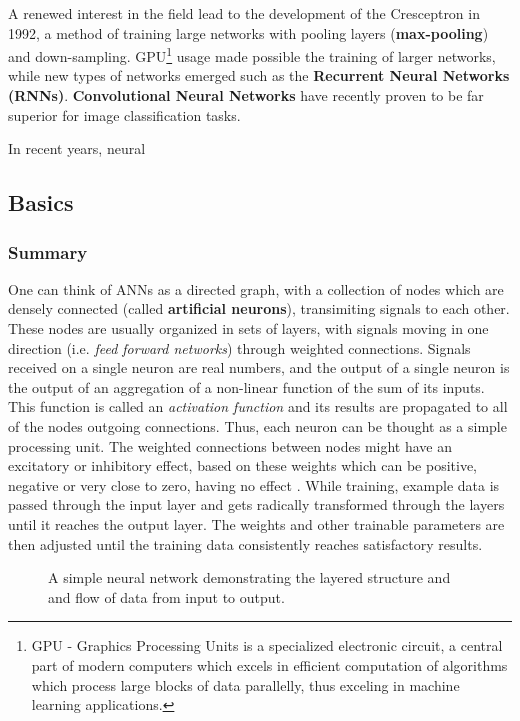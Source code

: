 A renewed interest in the field lead to the development of the
Cresceptron \cite{article:Cresceptron} in 1992, a method of training
large networks with pooling layers (\textbf{max-pooling}) and down-sampling.
GPU\footnote{GPU - Graphics Processing Units is a specialized
electronic circuit, a central part of modern computers which excels in
    efficient computation of algorithms which process large blocks of data
    parallelly, thus exceling in machine learning applications.} usage made
    possible the training of larger networks, while new types of networks
    emerged such as the \textbf{Recurrent Neural Networks (RNNs)}.
    \textbf{Convolutional Neural Networks} have recently proven to be
    far superior for image classification tasks.

    In recent years, neural 


    \subsection{Basics}
    \subsubsection{Summary}

    One can think of ANNs as a directed graph, with a collection of nodes
    which are densely connected (called \textbf{artificial neurons}),
    transimiting signals to each other. These nodes are usually organized
    in sets of layers, with signals moving in one direction
    (i.e. \textit{feed forward networks}) through weighted connections.
    Signals received on a single neuron are real numbers, and the output
    of a single neuron is the output of an aggregation of a non-linear
    function of the sum of its inputs. This function is called an
    \textit{activation function} and its results are propagated to all of
    the nodes outgoing connections.  Thus, each neuron can be thought as a
    simple processing unit. The weighted connections between nodes might
    have an excitatory or inhibitory effect, based on these weights which
    can be positive, negative or very close to zero, having no effect
    \cite[Chap. ~ 1]{book:Gurney1997AnIT}. While training, example
    data is passed through the input layer and gets radically transformed
    through the layers until it reaches the output layer. The weights and
    other trainable parameters are then adjusted until the training data
    consistently reaches satisfactory results.

    \begin{figure}[h!]
    \centering
    \scalebox{.8}{}
    \caption{A simple neural network demonstrating the layered structure and
    and flow of data from input to output.}
    \label{fig:simple_nn_demo}
    \end{figure}
    \newpage
